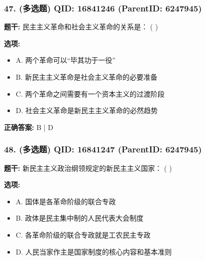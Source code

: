 \documentclass[12pt,UTF8]{ctexart}
\begin{document}
\vspace{0.3em}\hrulefill\vspace{0.7em}

\subsubsection*{47. (多选题) \small QID: 16841246 (ParentID: 6247945)}

\textbf{题干:}
民主主义革命和社会主义革命的关系是： ( )



\textbf{选项:}
\begin{itemize}[leftmargin=*]

  \item A. 两个革命可以“毕其功于一役”

  \item B. 新民主主义革命是社会主义革命的必要准备

  \item C. 两个革命之间需要有一个资本主义的过渡阶段

  \item D. 社会主义革命是新民主主义革命的必然趋势

\end{itemize}

\textbf{正确答案:}
B | D

\vspace{0.3em}\hrulefill\vspace{0.7em}

\subsubsection*{48. (多选题) \small QID: 16841247 (ParentID: 6247945)}

\textbf{题干:}
新民主主义政治纲领规定的新民主主义国家： ( )



\textbf{选项:}
\begin{itemize}[leftmargin=*]

  \item A. 国体是各革命阶级的联合专政

  \item B. 政体是民主集中制的人民代表大会制度

  \item C. 各革命阶级的联合专政就是工农民主专政

  \item D. 人民当家作主是国家制度的核心内容和基本准则

\end{itemize}
\end{document}
